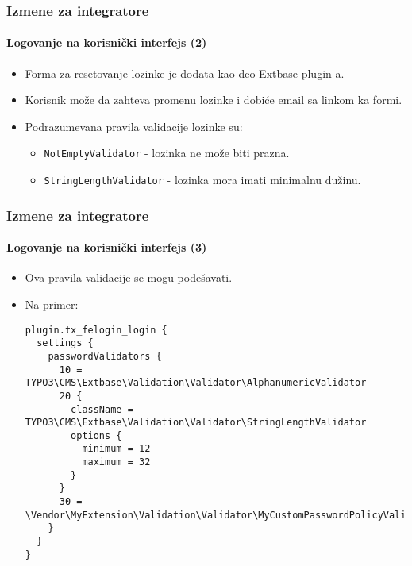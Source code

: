 
\begin{frame}[fragile]
	\frametitle{Izmene za integratore}
	\framesubtitle{Logovanje na korisnički interfejs (2)}

	\begin{itemize}

		\item Forma za resetovanje lozinke je dodata kao deo Extbase plugin-a.
		\item Korisnik može da zahteva promenu lozinke i dobiće email sa linkom ka formi.
		\item Podrazumevana pravila validacije lozinke su:

			\begin{itemize}
				\item \texttt{NotEmptyValidator} - lozinka ne može biti prazna.
				\item \texttt{StringLengthValidator} - lozinka mora imati minimalnu dužinu.
			\end{itemize}

	\end{itemize}

\end{frame}


\begin{frame}[fragile]
	\frametitle{Izmene za integratore}
	\framesubtitle{Logovanje na korisnički interfejs (3)}

	\lstset{basicstyle=\tiny\ttfamily}

	\begin{itemize}
		\item Ova pravila validacije se mogu podešavati.
		\item Na primer:
\begin{lstlisting}
plugin.tx_felogin_login {
  settings {
    passwordValidators {
      10 = TYPO3\CMS\Extbase\Validation\Validator\AlphanumericValidator
      20 {
        className = TYPO3\CMS\Extbase\Validation\Validator\StringLengthValidator
        options {
          minimum = 12
          maximum = 32
        }
      }
      30 = \Vendor\MyExtension\Validation\Validator\MyCustomPasswordPolicyValidator
    }
  }
}
\end{lstlisting}

	\end{itemize}

\end{frame}

